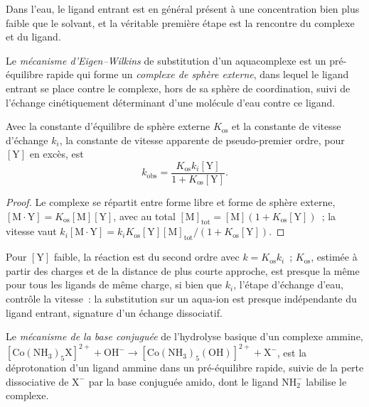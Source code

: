 Dans l'eau, le ligand entrant est en général présent à une concentration
bien plus faible que le solvant, et la véritable première étape est la
rencontre du complexe et du ligand.

\begin{definition}\label{def:b3:complex-mechanisms:eigen-wilkins}
Le \emph{mécanisme d'Eigen--Wilkins} de
substitution d'un aquacomplexe est un pré-équilibre rapide qui forme un
\emph{complexe de sphère externe}, dans lequel le ligand
entrant se place contre le complexe, hors de sa sphère de coordination,
suivi de l'échange cinétiquement déterminant d'une molécule d'eau contre ce
ligand.
\end{definition}

\begin{theorem}\label{thm:b3:complex-mechanisms:eigen-wilkins}
Avec la constante d'équilibre de sphère externe $K_{\mathrm{os}}$ et la
constante de vitesse d'échange $k_i$, la constante de vitesse apparente de
pseudo-premier ordre, pour $[\mathrm Y]$ en excès, est
\[
  k_{\mathrm{obs}} = \frac{K_{\mathrm{os}}k_i[\mathrm Y]}{1 + K_{\mathrm{os}}[\mathrm Y]} .
\]
\end{theorem}

\begin{proof}
Le complexe se répartit entre forme libre et forme de sphère externe, $[\mathrm{M\cdot Y}] = K_{\mathrm{os}}[\mathrm M][\mathrm Y]$,
avec au total $[\mathrm M]_{\mathrm{tot}} = [\mathrm M](1 + K_{\mathrm{os}}[\mathrm Y])$~; la vitesse vaut $k_i[\mathrm{M\cdot Y}] = k_iK_{\mathrm{os}}[\mathrm Y][\mathrm M]_{\mathrm{tot}}/(1 + K_{\mathrm{os}}[\mathrm Y])$.
\end{proof}

Pour $[\mathrm Y]$ faible, la réaction est du second ordre avec $k = K_{\mathrm{os}}k_i$~; $K_{\mathrm{os}}$,
estimée à partir des charges et de la distance de plus courte approche, est
presque la même pour tous les ligands de même charge, si bien que $k_i$,
l'étape d'échange d'eau, contrôle la vitesse~: la substitution sur un
aqua-ion est presque indépendante du ligand entrant, signature d'un
échange dissociatif.

\begin{definition}\label{def:b3:complex-mechanisms:conjugate-base}
Le \emph{mécanisme de la base conjuguée} de
l'hydrolyse basique d'un complexe ammine, $\mathrm{[Co(NH_3)_5X]^{2+} + OH^- \to [Co(NH_3)_5(OH)]^{2+} + X^-}$, est
la déprotonation d'un ligand ammine dans un pré-équilibre rapide, suivie de
la perte dissociative de $\mathrm X^-$ par la base conjuguée amido, dont le
ligand $\mathrm{NH_2^-}$ labilise le complexe.
\end{definition}


